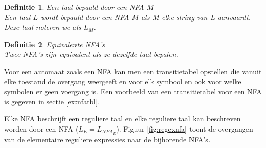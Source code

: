 \documentclass[a4paper]{article}
\newtheorem{tdefinitie}{Definitie}[section]
\newenvironment{definitie}[1]%
  {\begin{mdframed}[backgroundcolor=silver,
    topline=false,
    rightline=false,
    leftline=false,
    bottomline=false]\begin{tdefinitie}#1\\\normalfont}%
  {\end{tdefinitie}\end{mdframed}}
\begin{document}
\begin{definitie}{Een taal bepaald door een NFA $M$}
  Een taal $L$ wordt bepaald door een NFA $M$ als $M$ elke string van $L$ aanvaardt. Deze taal noteren we als $L_M$.
\end{definitie}

\begin{definitie}{Equivalente NFA's}
  Twee NFA's zijn equivalent als ze dezelfde taal bepalen.
\end{definitie}

Voor een automaat zoals een NFA kan men een transitietabel opstellen die vanuit elke toestand de overgang weergeeft en voor elk symbool en ook voor welke symbolen er geen voergang is. Een voorbeeld van een transitietabel voor een NFA is gegeven in sectie \ref{ex:nfatbl}.

Elke NFA beschrijft een reguliere taal en elke reguliere taal kan beschreven worden door een NFA ($L_E = L_{NFA_E}$). Figuur \ref{fig:regexnfa} toont de overgangen van de elementaire reguliere expressies naar de bijhorende NFA's.
\end{document}
